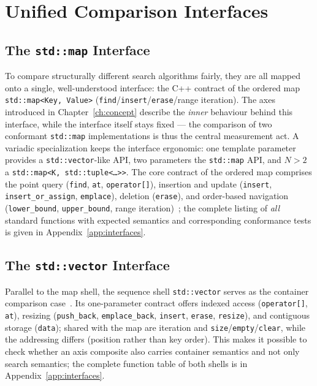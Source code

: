 \section{Unified Comparison Interfaces}\label{sec:compare-interfaces}
\subsection{The \texttt{std::map} Interface}\label{sec:stdmap-interface}
To compare structurally different search algorithms fairly, they are all mapped onto a single,
well-understood interface: the C++ contract of the ordered map \texttt{std::map<Key,\,Value>}
(\texttt{find}/\texttt{insert}/\texttt{erase}/range iteration). The axes introduced in
Chapter~\ref{ch:concept} describe the \emph{inner} behaviour behind this interface, while the
interface itself stays fixed --- the comparison of two conformant \texttt{std::map} implementations
is thus the central measurement act. A variadic specialization keeps the interface ergonomic: one
template parameter provides a \texttt{std::vector}-like API, two parameters the \texttt{std::map}
API, and $N>2$ a \texttt{std::map<K,\,std::tuple<\ldots>>}. The core contract of the ordered map
comprises the point query (\texttt{find}, \texttt{at}, \texttt{operator[]}), insertion and update
(\texttt{insert}, \texttt{insert\_or\_assign}, \texttt{emplace}), deletion (\texttt{erase}), and
order-based navigation (\texttt{lower\_bound}, \texttt{upper\_bound}, range
iteration)~\cite{iso_cpp}; the complete listing of \emph{all} standard functions with expected
semantics and corresponding conformance tests is given in Appendix~\ref{app:interfaces}.

\subsection{The \texttt{std::vector} Interface}\label{ssec:stdvector-interface}
Parallel to the map shell, the sequence shell \texttt{std::vector} serves as the container
comparison case~\cite{iso_cpp}. Its one-parameter contract offers indexed access
(\texttt{operator[]}, \texttt{at}), resizing (\texttt{push\_back}, \texttt{emplace\_back},
\texttt{insert}, \texttt{erase}, \texttt{resize}), and contiguous storage (\texttt{data}); shared
with the map are iteration and \texttt{size}/\texttt{empty}/\texttt{clear}, while the addressing
differs (position rather than key order). This makes it possible to check whether an axis composite
also carries container semantics and not only search semantics; the complete function table of both
shells is in Appendix~\ref{app:interfaces}.

